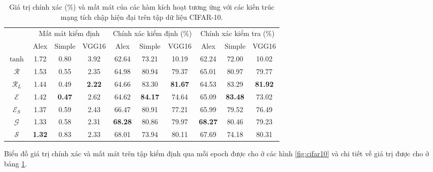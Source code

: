 \begin{table}[ht!]
\centering
\def\arraystretch{1.1}
\begin{tabular}{c|c|c|c|c|c|c|c|c|c|}
\cline{2-10}
                        & \multicolumn{3}{c|}{Mất mát kiểm định} & \multicolumn{3}{c|}{Chính xác kiểm định (\%)} & \multicolumn{3}{c|}{Chính xác kiểm tra (\%)} \\ \cline{2-10} 
                        & Alex     & Simple     & VGG16    & Alex      & Simple     & VGG16     & Alex     & Simple     & VGG16     \\ \hline
\multicolumn{1}{|c|}{$\tanh$} & 1.72        & 0.80          & 3.92     & 62.64        & 73.21         & 10.19     & 62.24       & 72.00         & 10.02     \\ \hline
\multicolumn{1}{|c|}{$\mathcal{R}$} & 1.53        & 0.55          & 2.35     & 64.98        & 80.94         & 79.37     & 65.01       & 80.97         & 79.77     \\ \hline
\multicolumn{1}{|c|}{$\mathcal{R}_L$} & 1.44        & 0.49          & \textbf{2.22}     & 64.66        & 83.30         & \textbf{81.67}     & 64.53       & 83.29         & \textbf{81.92}     \\ \hline
\multicolumn{1}{|c|}{$\mathcal{E}$} & 1.42        & \textbf{0.47}          & 2.62     & 64.62        & \textbf{84.17}         & 74.64     & 65.09       & \textbf{83.48}         & 73.02     \\ \hline
\multicolumn{1}{|c|}{$\mathcal{E}_S$} & 1.37        & 0.59          & 2.43     & 66.47        & 80.91         & 77.21     & 65.99       & 79.52         & 76.49     \\ \hline
\multicolumn{1}{|c|}{$\mathcal{G}$} & 1.33        & 0.58          & 2.31     & \textbf{68.28}        & 80.86         & 79.97     & \textbf{68.27}       & 80.46         & 79.23     \\ \hline
\multicolumn{1}{|c|}{$\mathcal{S}$} & \textbf{1.32}        & 0.83          & 2.33     & 68.01        & 73.94         & 80.11     & 67.69       & 74.18         & 80.31     \\ \hline
\end{tabular}
\caption{Giá trị chính xác (\%) và mất mát của các hàm kích hoạt tương ứng với các kiến trúc mạng tích chập hiện đại trên tập dữ liệu CIFAR-10.}
\label{tab:cifar10}
\end{table}

Biểu đồ giá trị chính xác và mất mát trên tập kiểm định qua mỗi epoch được cho ở các hình \ref{fig:cifar10} và chi tiết về giá trị được cho ở bảng \ref{tab:cifar10}.
\vspace{5pt}

